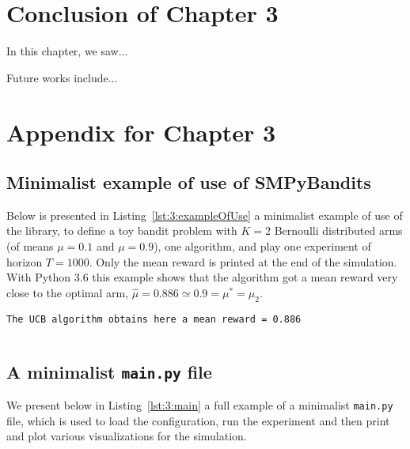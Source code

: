 \section{Conclusion of Chapter 3}
\label{sec:3:conclusion}

In this chapter, we saw...

Future works include...




\section{Appendix for Chapter 3}
\label{sec:3:appendix}


\subsection{Minimalist example of use of SMPyBandits}

Below is presented in Listing~\ref{lst:3:exampleOfUse} a minimalist example of use of the library, to define a toy bandit problem with $K=2$ Bernoulli distributed arms (of means $\mu=0.1$ and $\mu=0.9$), one \UCB{} algorithm, and play one experiment of horizon $T=1000$.
Only the mean reward is printed at the end of the simulation.
%
With Python 3.6 this example shows that the algorithm got a mean reward very close to the optimal arm, $\hat{\mu} = 0.886 \simeq 0.9 = \mu^* = \mu_2$.
\begin{verbatim}
The UCB algorithm obtains here a mean reward = 0.886
\end{verbatim}

    \inputminted[linenos=true,numbersep=5pt,frame=lines,framesep=2mm]{python3}{2-Chapters/3-Chapter/src/example_of_use_of_SMPyBandits.py}


\subsection{A minimalist \texttt{main.py} file}

We present below in Listing~\ref{lst:3:main} a full example of a minimalist \texttt{main.py} file,
which is used to load the configuration, run the experiment and then print and plot various visualizations for the simulation.

